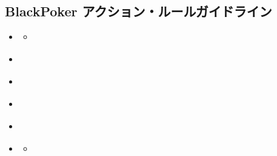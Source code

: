 \documentclass[letterpaper,10pt,dvipdfmx]{sphinxmanual}
\begin{document}
\subsection{BlackPoker アクション・ルールガイドライン}
\label{\detokenize{appendix/guideline/customRule:blackpoker}}\label{\detokenize{appendix/guideline/customRule::doc}}
\begin{sphinxShadowBox}
\begin{itemize}
\item {} 
\sphinxAtStartPar
{}\label{\detokenize{appendix/guideline/customRule:id11}}{\hyperref[\detokenize{appendix/guideline/customRule:id2}]{}}
\begin{itemize}
\item {} 
\sphinxAtStartPar
{}\label{\detokenize{appendix/guideline/customRule:id12}}{\hyperref[\detokenize{appendix/guideline/customRule:id3}]{}}

\end{itemize}

\item {} 
\sphinxAtStartPar
{}\label{\detokenize{appendix/guideline/customRule:id13}}{\hyperref[\detokenize{appendix/guideline/customRule:id4}]{}}

\item {} 
\sphinxAtStartPar
{}\label{\detokenize{appendix/guideline/customRule:id14}}{\hyperref[\detokenize{appendix/guideline/customRule:id5}]{}}

\item {} 
\sphinxAtStartPar
{}\label{\detokenize{appendix/guideline/customRule:id15}}{\hyperref[\detokenize{appendix/guideline/customRule:id6}]{}}

\item {} 
\sphinxAtStartPar
{}\label{\detokenize{appendix/guideline/customRule:id16}}{\hyperref[\detokenize{appendix/guideline/customRule:id7}]{}}

\item {} 
\sphinxAtStartPar
{}\label{\detokenize{appendix/guideline/customRule:id17}}{\hyperref[\detokenize{appendix/guideline/customRule:id8}]{}}
\begin{itemize}
\item {} 
\sphinxAtStartPar
{}\label{\detokenize{appendix/guideline/customRule:id18}}{\hyperref[\detokenize{appendix/guideline/customRule:id9}]{}}


\end{itemize}
\end{itemize}
\end{sphinxShadowBox}
\end{document}
